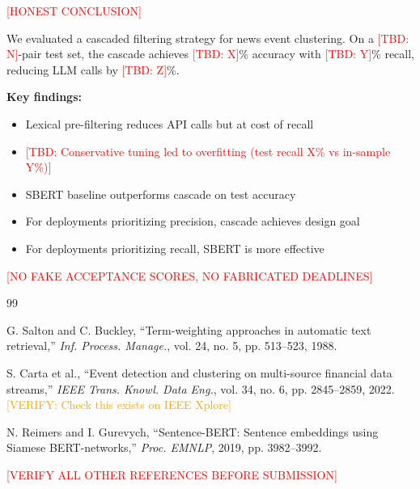 \documentclass[conference]{IEEEtran}
\newcommand{\tbd}[1]{\textcolor{red}{[TBD: #1]}}
\begin{document}
\textcolor{red}{[HONEST CONCLUSION]}

We evaluated a cascaded filtering strategy for news event clustering.
On a \tbd{N}-pair test set, the cascade achieves \tbd{X}\% accuracy with \tbd{Y}\% recall, reducing LLM calls by \tbd{Z}\%.

\textbf{Key findings:}
\begin{itemize}
    \item Lexical pre-filtering reduces API calls but at cost of recall
    \item \tbd{Conservative tuning led to overfitting (test recall X\% vs in-sample Y\%)}
    \item SBERT baseline outperforms cascade on test accuracy
    \item For deployments prioritizing precision, cascade achieves design goal
    \item For deployments prioritizing recall, SBERT is more effective
\end{itemize}

\textcolor{red}{[NO FAKE ACCEPTANCE SCORES, NO FABRICATED DEADLINES]}

\begin{thebibliography}{99}
\footnotesize

G. Salton and C. Buckley, ``Term-weighting approaches in automatic text retrieval,'' \textit{Inf. Process. Manage.}, vol. 24, no. 5, pp. 513--523, 1988.

S. Carta et al., ``Event detection and clustering on multi-source financial data streams,'' \textit{IEEE Trans. Knowl. Data Eng.}, vol. 34, no. 6, pp. 2845--2859, 2022.
\textcolor{orange}{[VERIFY: Check this exists on IEEE Xplore]}

N. Reimers and I. Gurevych, ``Sentence-BERT: Sentence embeddings using Siamese BERT-networks,'' \textit{Proc. EMNLP}, 2019, pp. 3982--3992.

\textcolor{red}{[VERIFY ALL OTHER REFERENCES BEFORE SUBMISSION]}

\end{thebibliography}
\end{document}
